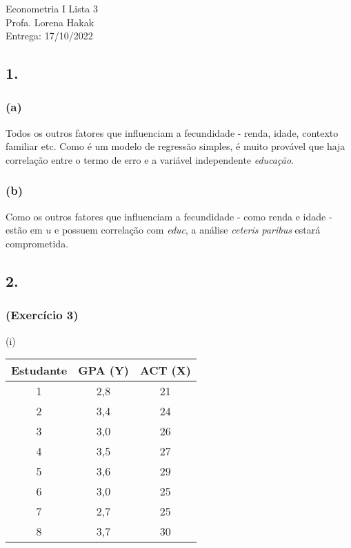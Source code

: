 \documentclass[hidelinks,11pt]{book}
\theoremstyle{definition}
\begin{document}
	
	
	\begin{center}
		{\Large Econometria I \hspace{0.5cm} Lista 3}\\
		Profa. Lorena Hakak\\
		Entrega: 17/10/2022
	\end{center}
	
	\vspace{0.2 cm}
	
	
	\subsection*{1.}
	
\subsubsection{(a)}

Todos os outros fatores que influenciam a fecundidade - renda, idade, contexto familiar etc. Como é um modelo de regressão simples, é muito provável que haja correlação entre o termo de erro e a variável independente \textit{educação}.

\subsubsection{(b)}

Como os outros fatores que influenciam a fecundidade - como renda e idade - estão em $u$ e possuem correlação com \textit{educ}, a análise \textit{ceteris paribus} estará comprometida.



	\subsection*{2.}
	
\subsubsection{(Exercício 3)}

(i)

	\begin{center}
	\begin{tabular}{|c|c|c|}\hline
		\textbf{Estudante} & \textbf{GPA (Y)} & \textbf{ACT (X)} \\\hline
		1 & 2,8 & 21 \\\hline
		2 & 3,4 & 24 \\\hline
		3 & 3,0 & 26 \\\hline
		4 & 3,5 & 27 \\\hline
		5 & 3,6 & 29 \\\hline
		6 & 3,0 & 25 \\\hline
		7 & 2,7 & 25 \\\hline
		8 & 3,7 & 30 \\\hline
	\end{tabular}
\end{center}
\end{document}
